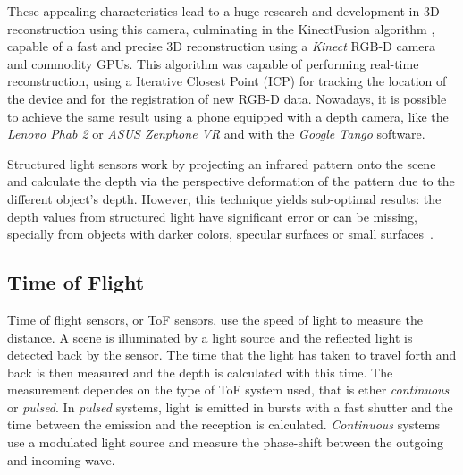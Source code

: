 These appealing characteristics lead to a huge research and development in 3D reconstruction using this camera, culminating in the KinectFusion algorithm \cite{kinectfusion2011}, capable of a fast and precise 3D reconstruction using a \textit{Kinect} RGB-D camera and commodity GPUs. This algorithm was capable of performing real-time reconstruction, using a Iterative Closest Point (ICP) for tracking the location of the device and for the registration of new RGB-D data. Nowadays, it is possible to achieve the same result using a phone equipped with a depth camera, like the \textit{Lenovo Phab 2} or \textit{ASUS Zenphone VR} and with the \textit{Google Tango} software. 

Structured light sensors work by projecting an infrared pattern onto the scene and calculate the depth via the perspective deformation of the pattern due to the different object's depth. However, this technique yields sub-optimal results: the depth values from structured light have significant error or can be missing, specially from objects with darker colors, specular surfaces or small surfaces~\cite{shen2013}. 

\subsection{Time of Flight}

Time of flight sensors, or ToF sensors, use the speed of light to measure the distance. A scene is illuminated by a light source and the reflected light is detected back by the sensor. The time that the light has taken to travel forth and back is then measured and the depth is calculated with this time. The measurement dependes on the type of ToF system used, that is ether \textit{continuous} or \textit{pulsed}. In \textit{pulsed} systems, light is emitted in bursts with a fast shutter and the time between the emission and the reception is calculated. \textit{Continuous} systems use a modulated light source and measure the phase-shift between the outgoing and incoming wave.

